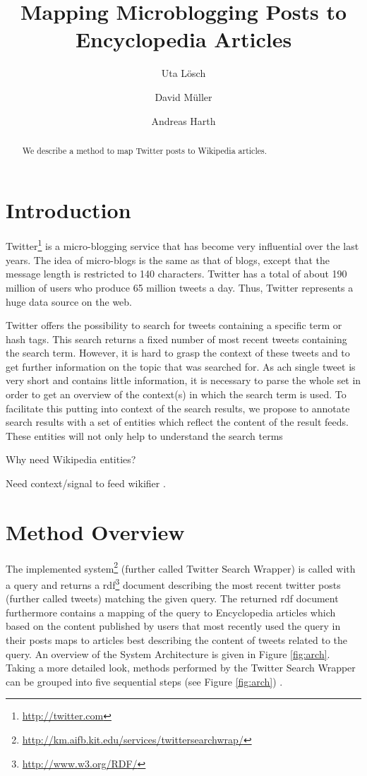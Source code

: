 \documentclass{llncs}
\title{Mapping Microblogging Posts to Encyclopedia Articles}
\author{Uta L\"{o}sch \and David M\"{u}ller \and Andreas Harth}
\institute{
	Karlsruhe Institute of Technology (KIT), D-76131 Karlsruhe, Germany\\ 
	\email{uta.loesch@kit.edu},\\
	\email{david.mueller@student.kit.edu},\\
	\email{harth@kit.edu}
}
\begin{document}
\maketitle

\begin{abstract}
We describe a method to map Twitter posts to Wikipedia articles.
\end{abstract}

\section{Introduction}

Twitter\footnote{\url{http://twitter.com}} is a micro-blogging service that has become very influential over the last years. The idea of micro-blogs is the same as that of blogs, except that the message length is restricted to 140 characters. Twitter has a total of about 190 million of users who produce 65 million tweets a day. Thus, Twitter represents a huge data source on the web.

Twitter offers the possibility to search for tweets containing a specific term or hash tags. This search returns a fixed number of most recent tweets containing the search term. However, it is hard to grasp the context of these tweets and to get further information on the topic that was searched for. As ach single tweet is very short and contains little information, it is necessary to parse the whole set in order to get an overview of the context(s) in which the search term is used. To facilitate this putting into context of the search results, we propose to annotate search results with a set of entities which reflect the content of the result feeds. These entities will not only help to understand the search terms

Why need Wikipedia entities?

Need context/signal to feed wikifier \cite{key:wikifier}.

\section{Method Overview}

The implemented
system\footnote{\url{http://km.aifb.kit.edu/services/twittersearchwrap/}}
(further called Twitter Search Wrapper) is called with a query and returns a
rdf\footnote{\url{http://www.w3.org/RDF/}} document describing the most recent
twitter posts (further called tweets) matching the given query. The returned rdf
document furthermore contains a mapping of the query to Encyclopedia articles
which based on the content published by users that most recently used the query
in their posts maps to articles best describing the content of tweets related to
the query. An overview of the System Architecture is given in Figure
\ref{fig:arch}. Taking a more detailed look, methods performed by the Twitter
Search Wrapper can be grouped into five sequential steps (see Figure
\ref{fig:arch}) .
 
\end{document}
